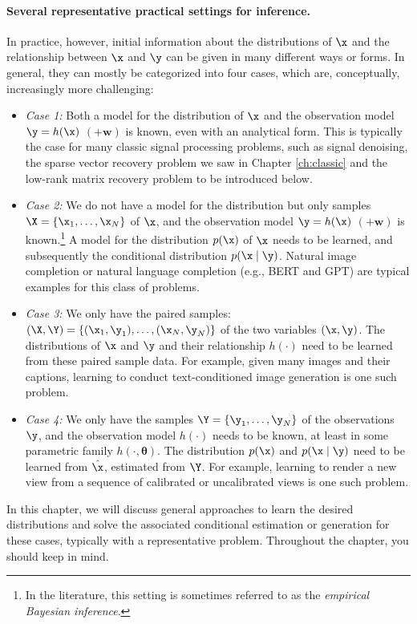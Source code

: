 \documentclass[../../book-main.tex]{subfiles}
\begin{document}
\paragraph{Several representative practical settings for inference.} 
In practice, however, initial information about the distributions of $\x$ and the relationship between $\x$ and $\y$ can be given in many different ways or forms. In general, they can mostly be categorized into four cases, which are, conceptually, increasingly more challenging:
\begin{itemize}
\item {\em Case 1:} Both a model for the distribution of $\x$ and the observation model $\y = h(\x)$ $(+ \boldsymbol{w})$ is known, even with an analytical form. This is typically the case for many classic signal processing problems, such as signal denoising, the sparse vector recovery problem we saw in Chapter \ref{ch:classic} and the low-rank matrix recovery problem to be introduced below.
\item {\em Case 2:} We do not have a model for the distribution but only samples $\X = \{\x_1, \ldots, \x_N\}$ of $\x$, and the observation model $\y = h(\x)$ $ (+ \boldsymbol{w})$ is known.\footnote{In the literature, this setting is sometimes referred to as the {\em empirical Bayesian inference}.} A model for the distribution $p(\x)$ of $\x$ needs to be learned, and subsequently the conditional distribution $p(\x\mid \y)$. Natural image completion or natural language completion (e.g., BERT and GPT) are  typical examples for this class of problems.
\item {\em Case 3:} We only have the paired samples: $(\X, \Y) = \{ (\x_1, \y_1), \ldots, (\x_N, \y_N) \}$ of the two variables  $(\x, \y)$. The distributions of $\x$ and $\y$ and their relationship $h(\cdot)$ need to be learned from these paired sample data. For example, given many images and their captions, learning to conduct text-conditioned image generation is one such problem. 
\item {\em Case 4:} We only have the samples $\Y = \{\y_1, \ldots, \y_N\}$ of the observations $\y$, and the observation model $h(\cdot)$ needs to be known, at least in some parametric family $h(\cdot, \boldsymbol{\theta})$. The distribution $p(\x)$ and $p(\x \mid \y)$ need to be learned from $\hat \x$, estimated from $\Y$. For example, learning to render a new view from a sequence of calibrated or uncalibrated views is one such problem.
\end{itemize}
In this chapter, we will discuss general approaches to learn the desired distributions and solve the associated conditional estimation or generation for these cases, typically with a representative problem.  Throughout the chapter, you should keep  in mind.
\end{document}
